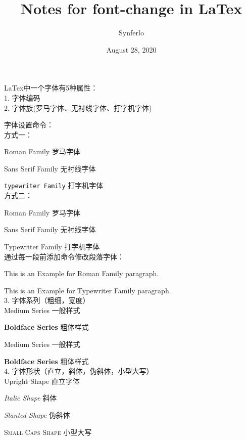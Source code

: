 \documentclass{article}
\title{Notes for font-change in LaTex}
\author{Synferlo}
\date{August 28, 2020}
\begin{document}
\maketitle
    \newpage
    LaTex中一个字体有5种属性：\\

    1. 字体编码\\


    2. 字体族(罗马字体、无衬线字体、打字机字体)

    字体设置命令：\\

    方式一：

    \textrm{Roman Family} 罗马字体
    
    \textsf{Sans Serif Family} 无衬线字体


    \texttt{typewriter Family} 打字机字体\\

    方式二：

    \rmfamily Roman Family 罗马字体

    \sffamily Sans Serif Family 无衬线字体

    \ttfamily Typewriter Family 打字机字体\\

    通过每一段前添加命令修改段落字体：

    \rmfamily This is an Example for Roman Family paragraph.

    \ttfamily This is an Example for Typewriter Family paragraph.\\


    3. 字体系列（粗细，宽度）\\

    \textmd{Medium Series} 一般样式
    
    \textbf{Boldface Series} 粗体样式

    {\mdseries Medium Series} 一般样式

    {\bfseries Boldface Series} 粗体样式\\%

    4. 字体形状（直立，斜体，伪斜体，小型大写）\\

    \textup{Upright Shape} 直立字体

    \textit{Italic Shape} 斜体

    \textsl{Slanted Shape} 伪斜体

    \textsc{Small Caps Shape} 小型大写\\
\end{document}

